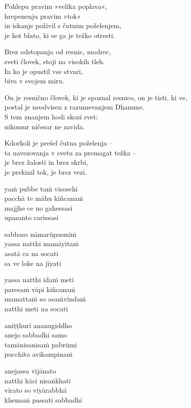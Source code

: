 Pohlepu pravim »velika poplava«,\\
hrepenenju pravim »tok«\\
in iskanje poživil s čutnim poželenjem,\\
je kot blato, ki se ga je težko otresti.

Brez odstopanja od resnic, modrec,\\
sveti človek, stoji na visokih tleh.\\
In ko je opustil vse stvari,\\
biva v svojem miru.

On je resnično človek, ki je spoznal resnico, on je tisti, ki ve,\\
postal je neodvisen z razumevanjem Dhamme.\\
S tem znanjem hodi skozi svet;\\
nikomur ničesar ne zavida.

Kdorkoli je prešel čutna poželenja --\\
ta navezovanja v svetu za premagat težka --\\
je brez žalosti in brez skrbi,\\
je prekinil tok, je brez vezi.


\clearpage

yaṁ pubbe taṁ visosehi\\
pacchā te māhu kiñcanaṁ\\
majjhe ce no gahessasi\\
upasanto carissasi

sabbaso nāmarūpasmiṁ\\
yassa natthi mamāyitaṁ\\
asatā ca na socati\\
sa ve loke na jīyati

yassa natthi idaṁ meti\\
paresaṁ vāpi kiñcanaṁ\\
mamattaṁ so asaṁvindaṁ\\
natthi meti na socati

aniṭṭhurī ananugiddho\\
anejo sabbadhī samo\\
tamānisaṁsaṁ pabrūmi\\
pucchito avikampinaṁ

anejassa vijānato\\
natthi kāci nisaṅkhati\\
virato so viyārabbhā\\
khemaṁ passati sabbadhi


